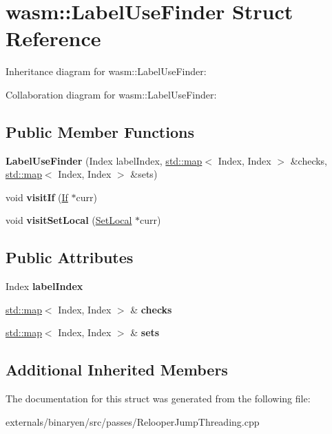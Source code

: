 \hypertarget{structwasm_1_1_label_use_finder}{}\section{wasm\+:\+:Label\+Use\+Finder Struct Reference}
\label{structwasm_1_1_label_use_finder}


Inheritance diagram for wasm\+:\+:Label\+Use\+Finder\+:


Collaboration diagram for wasm\+:\+:Label\+Use\+Finder\+:
\subsection*{Public Member Functions}
\begin{DoxyCompactItemize}
\item 
\mbox{\label{structwasm_1_1_label_use_finder_a47a0bbd0c4a02c991c2e5dcba3bd194d}} 
{\bfseries Label\+Use\+Finder} (Index label\+Index, \mbox{\hyperlink{classstd_1_1map}{std\+::map}}$<$ Index, Index $>$ \&checks, \mbox{\hyperlink{classstd_1_1map}{std\+::map}}$<$ Index, Index $>$ \&sets)
\item 
\mbox{\label{structwasm_1_1_label_use_finder_adf406a2e49c48ea1ad0185958265e74e}} 
void {\bfseries visit\+If} (\mbox{\hyperlink{classwasm_1_1_if}{If}} $\ast$curr)
\item 
\mbox{\label{structwasm_1_1_label_use_finder_a3923251256d863e3c2099943438c1407}} 
void {\bfseries visit\+Set\+Local} (\mbox{\hyperlink{classwasm_1_1_set_local}{Set\+Local}} $\ast$curr)
\end{DoxyCompactItemize}
\subsection*{Public Attributes}
\begin{DoxyCompactItemize}
\item 
\mbox{\label{structwasm_1_1_label_use_finder_a455673155cd361f410b2cf5b86524ebc}} 
Index {\bfseries label\+Index}
\item 
\mbox{\label{structwasm_1_1_label_use_finder_a61b15090d6ac4a71c9a8f4a87db6af73}} 
\mbox{\hyperlink{classstd_1_1map}{std\+::map}}$<$ Index, Index $>$ \& {\bfseries checks}
\item 
\mbox{\label{structwasm_1_1_label_use_finder_a879bdf3614b3f9d1f4f2fc6898e5869d}} 
\mbox{\hyperlink{classstd_1_1map}{std\+::map}}$<$ Index, Index $>$ \& {\bfseries sets}
\end{DoxyCompactItemize}
\subsection*{Additional Inherited Members}


The documentation for this struct was generated from the following file\+:\begin{DoxyCompactItemize}
\item 
externals/binaryen/src/passes/Relooper\+Jump\+Threading.\+cpp\end{DoxyCompactItemize}
